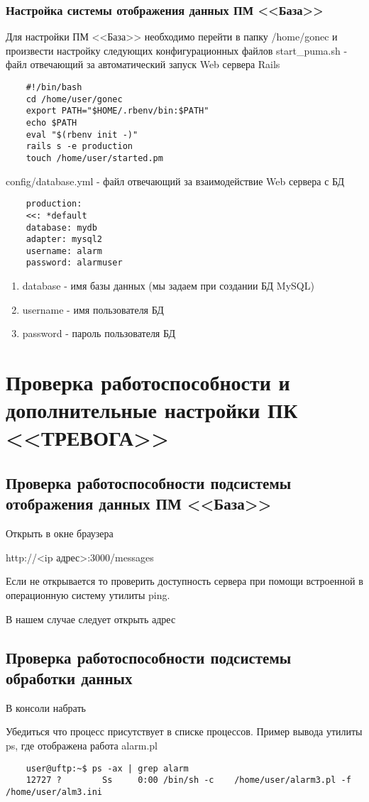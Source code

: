 \documentclass[12pt]{article}[a4paper,14pt,russian]
\begin{document}
	\subsubsection{Настройка системы отображения данных ПМ <<База>>}
	Для настройки ПМ <<База>> необходимо перейти в папку /home/gonec и произвести 
	настройку следующих конфигурационных файлов
	start\_puma.sh - файл отвечающий за автоматический запуск Web сервера Rails
	\begin{verbatim}
	#!/bin/bash
	cd /home/user/gonec
	export PATH="$HOME/.rbenv/bin:$PATH"
	echo $PATH
	eval "$(rbenv init -)"
	rails s -e production
	touch /home/user/started.pm
	\end{verbatim}

    config/database.yml - файл отвечающий за взаимодействие Web сервера с БД
\begin{verbatim}
	production:
	<<: *default
	database: mydb
	adapter: mysql2
	username: alarm
	password: alarmuser
\end{verbatim}	
 \begin{enumerate}
\item database - имя базы данных (мы задаем при создании БД  MySQL)
\item username - имя пользователя БД
\item password - пароль пользователя БД
  \end{enumerate}
	\section {Проверка работоспособности и дополнительные настройки ПК <<ТРЕВОГА>>}	
	\subsection{Проверка работоспособности подсистемы отображения данных ПМ <<База>>}
	Открыть в окне браузера 
	
	http://<ip адрес>:3000/messages
	
	Если не открывается то проверить доступность сервера при
	помощи встроенной в операционную систему утилиты ping.
	
   
   
    В нашем случае следует открыть адрес
    
    
    \subsection{Проверка работоспособности подсистемы обработки данных}
    В консоли набрать
    
    
    
    
    Убедиться что процесс присутствует в списке процессов. Пример вывода утилиты ps, где отображена работа alarm.pl
    \begin{verbatim}
    user@uftp:~$ ps -ax | grep alarm
    12727 ?        Ss     0:00 /bin/sh -c    /home/user/alarm3.pl -f /home/user/alm3.ini
    \end{verbatim}
 
\end{document}
